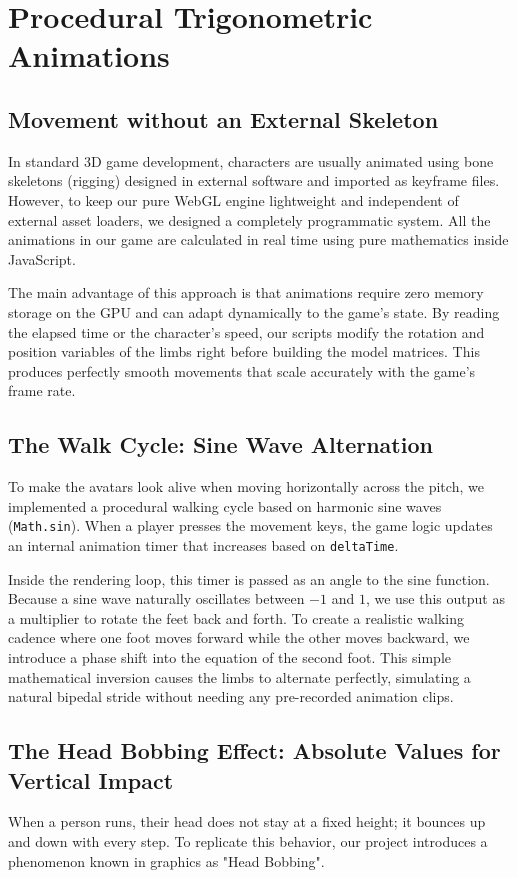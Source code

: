 \chapter{Procedural Trigonometric Animations}

\section{Movement without an External Skeleton}
In standard 3D game development, characters are usually animated using bone skeletons (rigging) designed in external software and imported as keyframe files. However, to keep our pure WebGL engine lightweight and independent of external asset loaders, we designed a completely programmatic system. All the animations in our game are calculated in real time using pure mathematics inside JavaScript.

The main advantage of this approach is that animations require zero memory storage on the GPU and can adapt dynamically to the game's state. By reading the elapsed time or the character's speed, our scripts modify the rotation and position variables of the limbs right before building the model matrices. This produces perfectly smooth movements that scale accurately with the game's frame rate.

\section{The Walk Cycle: Sine Wave Alternation}
To make the avatars look alive when moving horizontally across the pitch, we implemented a procedural walking cycle based on harmonic sine waves (\texttt{Math.sin}). When a player presses the movement keys, the game logic updates an internal animation timer that increases based on \texttt{deltaTime}.

Inside the rendering loop, this timer is passed as an angle to the sine function. Because a sine wave naturally oscillates between $-1$ and $1$, we use this output as a multiplier to rotate the feet back and forth. To create a realistic walking cadence where one foot moves forward while the other moves backward, we introduce a phase shift into the equation of the second foot. This simple mathematical inversion causes the limbs to alternate perfectly, simulating a natural bipedal stride without needing any pre-recorded animation clips.

\section{The Head Bobbing Effect: Absolute Values for Vertical Impact}
When a person runs, their head does not stay at a fixed height; it bounces up and down with every step. To replicate this behavior, our project introduces a phenomenon known in graphics as "Head Bobbing".

